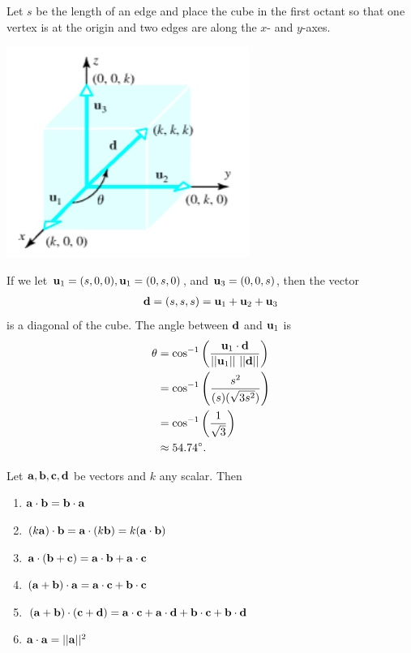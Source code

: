 \documentclass[12pt,letterpaper,reqno]{article}
\numberwithin{equation}{section}
\begin{document}
{\color{red} 
Let $s$ be the length of an edge and place the cube in the first octant so that one vertex is at the origin and two edges are along the $x$- and $y$-axes.
\begin{center}
	\includegraphics[scale=0.5]{figures_mvc/cube_coordinates}
\end{center}
If we let ${\bf u}_1=(s,0,0), {\bf u}_1=(0,s,0)$, and ${\bf u}_3=(0,0,s)$, then the vector
\begin{align*}
	{\bf d}=(s,s,s)={\bf u}_1+{\bf u}_2+{\bf u}_3
\end{align*}
is a diagonal of the cube. The angle between ${\bf d}$ and ${\bf u}_1$ is 
\begin{align*}
	\theta &=\cos^{-1}\left(\frac{{\bf u}_1 \cdot {\bf d}}{||{\bf u}_1 || \ || {\bf d}||}\right) \\
	&=\cos^{-1}\left(\frac{s^2}{(s)(\sqrt{3s^2})}\right)  \\
	&=\cos^{-1}\left(\frac{1}{\sqrt{3}}\right) \\
	&\approx 54.74^\circ.
\end{align*}
}

\begin{prop}
	Let ${\bf a}, {\bf b}, {\bf c}, {\bf d}$ be vectors and $k$ any scalar. Then 
	\begin{enumerate}[(1)]
		\item ${\bf a}\cdot {\bf b}={\bf b} \cdot {\bf a}$
		\item $(k {\bf a})\cdot {\bf b}={\bf a}\cdot (k{\bf b})=k({\bf a}\cdot {\bf b})$
		\item ${\bf a}\cdot ({\bf b}+{\bf c})={\bf a}\cdot {\bf b}+{\bf a}\cdot {\bf c}$
		\item $({\bf a}+{\bf b})\cdot {\bf a}={\bf a}\cdot {\bf c}+{\bf b}\cdot {\bf c}$
		\item $({\bf a}+{\bf b})\cdot ({\bf c}+{\bf d})={\bf a}\cdot {\bf c}+{\bf a}\cdot {\bf d}+{\bf b}\cdot {\bf c}+{\bf b}\cdot {\bf d}$
		\item ${\bf a} \cdot {\bf a}=||{\bf a}||^2$
	\end{enumerate}
\end{prop}
\end{document}
